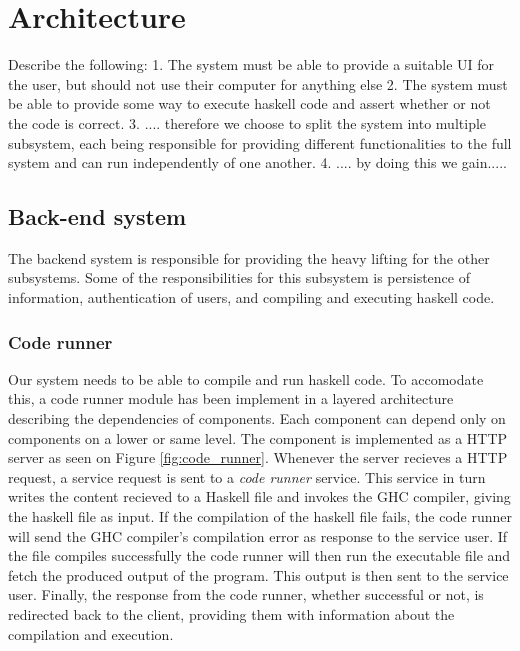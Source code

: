\section{Architecture}
Describe the following:
1. The system must be able to provide a suitable UI for the user, but should not use their computer for anything else 
2. The system must be able to provide some way to execute haskell code and assert whether or not the code is correct. 
3. .... therefore we choose to split the system into multiple subsystem, each being responsible for providing different functionalities to the full system and can run independently of one another. 
4. .... by doing this we gain.....


\subsection{Back-end system}
The backend system is responsible for providing the heavy lifting for the other subsystems. %
Some of the responsibilities for this subsystem is persistence of information, authentication of users, and compiling and executing haskell code.

\subsubsection{Code runner}
Our system needs to be able to compile and run haskell code. To accomodate this, a code runner module has been implement in a layered architecture describing the dependencies of components.
Each component can depend only on components on a lower or same level. 
The component is implemented as a HTTP server as seen on Figure \ref{fig:code_runner}.
Whenever the server recieves a HTTP request, a service request is sent to a \textit{code runner} service.
This service in turn writes the content recieved to a Haskell file and invokes the GHC compiler, giving the haskell file as input.
If the compilation of the haskell file fails, the code runner will send the GHC compiler's compilation error as response to the service user.
If the file compiles successfully the code runner will then run the executable file and fetch the produced output of the program.
This output is then sent to the service user.
Finally, the response from the code runner, whether successful or not, is redirected back to the client, providing them with information about the compilation and execution.


